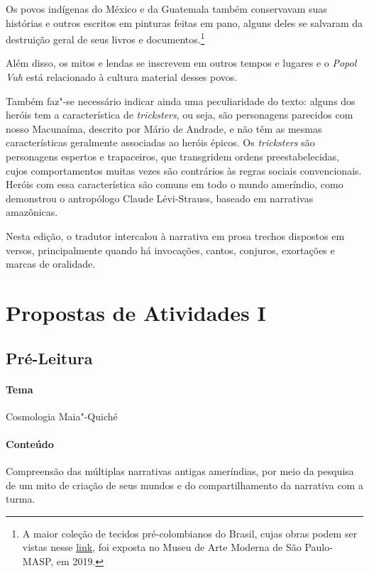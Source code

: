 \documentclass[11pt]{extarticle}
\begin{document}
Os povos indígenas do México e da Guatemala também conservavam suas histórias e outros escritos em pinturas feitas em pano, alguns deles se salvaram da destruição geral de seus livros e documentos.\footnote{A maior coleção de tecidos pré-colombianos do Brasil, cujas obras podem ser vistas nesse \href{https://masp.org.br/exposicoes/acervo-em-transformacao-comodato-masp-landmann-texteis-pre-colombianos}{link}, foi exposta no Museu de Arte Moderna de São Paulo-MASP, em 2019.}

Além disso, os mitos e lendas se inscrevem em outros tempos e lugares e o 
\textit{Popol Vuh} está relacionado à cultura material desses povos.

Também faz"-se necessário indicar ainda uma peculiaridade do texto: alguns dos heróis tem a característica de \textit{tricksters}, ou seja, são personagens parecidos com nosso Macunaíma, descrito por Mário de Andrade, e não têm as mesmas características geralmente associadas ao heróis épicos. Os \textit{tricksters} são personagens espertos e trapaceiros, que transgridem ordens preestabelecidas, cujos comportamentos muitas vezes são contrários às regras sociais convencionais.
Heróis com essa característica são comuns em todo o mundo ameríndio, como demonstrou o antropólogo Claude Lévi-Strauss, baseado em narrativas amazônicas.

Nesta edição, o tradutor intercalou à narrativa em prosa trechos dispostos em versos, principalmente quando há invocações, cantos, conjuros, exortações e marcas de oralidade.


\section{Propostas de Atividades I}

\subsection{Pré-Leitura}

\paragraph{Tema} Cosmologia Maia"-Quiché

\paragraph{Conteúdo} Compreensão das múltiplas narrativas antigas ameríndias, por meio da pesquisa 
de um mito de criação de seus mundos e do compartilhamento da narrativa com a turma.
\end{document}
